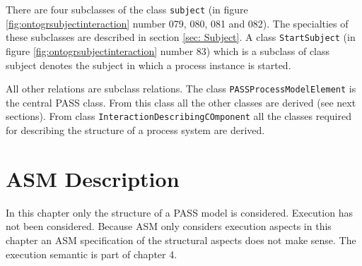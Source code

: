 There are four subclasses of the class \texttt{subject} (in figure \ref{fig:ontogrsubjectinteraction} number 079, 080, 081 and 082). The specialties of these subclasses are described in section \ref{sec: Subject}. A class \texttt{StartSubject} (in figure \ref{fig:ontogrsubjectinteraction} number 83) which is a subclass of class subject denotes the subject in which a process instance is started.

All other relations are subclass relations. The class \texttt{PASSProcessModelElement} is the central PASS class. From this class all the other classes are derived (see next sections). From class \texttt{InteractionDescribingCOmponent} all the classes required for describing the structure of a process system are derived.

\section{ASM Description}

In this chapter only the structure of a PASS model is considered. Execution has not been considered. Because ASM only considers execution aspects in this chapter an ASM specification of the structural aspects does not make sense. The execution semantic is part of chapter 4.
